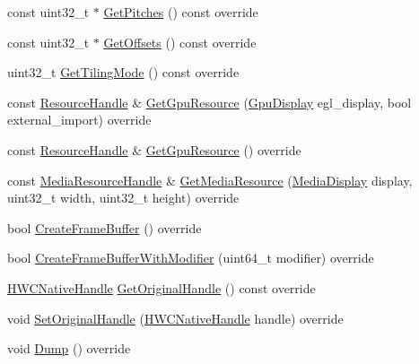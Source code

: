 \begin{DoxyCompactItemize}
\item 
const uint32\+\_\+t $\ast$ \mbox{\hyperlink{classhwcomposer_1_1DrmBuffer_a6241968d9bcfff9e6e746feb75422f17}{Get\+Pitches}} () const override
\item 
const uint32\+\_\+t $\ast$ \mbox{\hyperlink{classhwcomposer_1_1DrmBuffer_a4545b534f1266e287d351ddb6fc2e2db}{Get\+Offsets}} () const override
\item 
uint32\+\_\+t \mbox{\hyperlink{classhwcomposer_1_1DrmBuffer_ae559626c3e3029ab95906bbc5c9319f7}{Get\+Tiling\+Mode}} () const override
\item 
const \mbox{\hyperlink{namespacehwcomposer_a963c5a1d5902d2d05710dba19af35b48}{Resource\+Handle}} \& \mbox{\hyperlink{classhwcomposer_1_1DrmBuffer_a7a2a0fe73ce6ef5468c1dc6b3b099d88}{Get\+Gpu\+Resource}} (\mbox{\hyperlink{namespacehwcomposer_ace90739a34de8ec5b30559423cdef990}{Gpu\+Display}} egl\+\_\+display, bool external\+\_\+import) override
\item 
const \mbox{\hyperlink{namespacehwcomposer_a963c5a1d5902d2d05710dba19af35b48}{Resource\+Handle}} \& \mbox{\hyperlink{classhwcomposer_1_1DrmBuffer_a1dc65623ff13c470c9d71c4054bc6b36}{Get\+Gpu\+Resource}} () override
\item 
const \mbox{\hyperlink{namespacehwcomposer_aa99e35835961ac7d6baa59a04131ff42}{Media\+Resource\+Handle}} \& \mbox{\hyperlink{classhwcomposer_1_1DrmBuffer_a816ad1d2e1f7698eba57d58096b532dc}{Get\+Media\+Resource}} (\mbox{\hyperlink{namespacehwcomposer_a10d64930907cc775f9cea6b39d8cb404}{Media\+Display}} display, uint32\+\_\+t width, uint32\+\_\+t height) override
\item 
bool \mbox{\hyperlink{classhwcomposer_1_1DrmBuffer_af80ec38c8f6728e9448a9593e08ecf4b}{Create\+Frame\+Buffer}} () override
\item 
bool \mbox{\hyperlink{classhwcomposer_1_1DrmBuffer_a3055296aa0dc5fb96553c62217d0f08d}{Create\+Frame\+Buffer\+With\+Modifier}} (uint64\+\_\+t modifier) override
\item 
\mbox{\hyperlink{alios_2platformdefines_8h_ac0a2eaf260f556d17fe489911f017bdf}{H\+W\+C\+Native\+Handle}} \mbox{\hyperlink{classhwcomposer_1_1DrmBuffer_a66a876cebee293bc84bf0dc6edd35f0c}{Get\+Original\+Handle}} () const override
\item 
void \mbox{\hyperlink{classhwcomposer_1_1DrmBuffer_a2d7dbadddf5cce8260aa224af1b495c1}{Set\+Original\+Handle}} (\mbox{\hyperlink{alios_2platformdefines_8h_ac0a2eaf260f556d17fe489911f017bdf}{H\+W\+C\+Native\+Handle}} handle) override
\item 
void \mbox{\hyperlink{classhwcomposer_1_1DrmBuffer_ac4087d8c1084fede3414f6e578de9183}{Dump}} () override
\end{DoxyCompactItemize}
